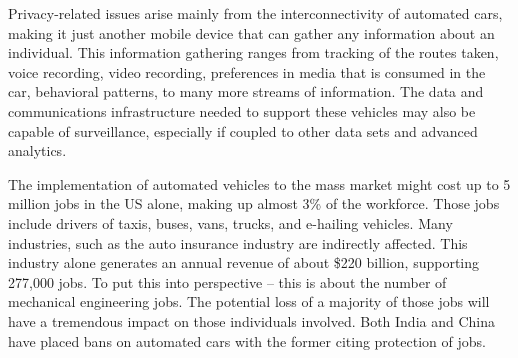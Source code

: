Privacy-related issues arise mainly from the interconnectivity of automated
cars, making it just another mobile device that can gather any information about
an individual. This information gathering ranges from tracking of the routes
taken, voice recording, video recording, preferences in media that is consumed
in the car, behavioral patterns, to many more streams of information. The data and
communications infrastructure needed to support these vehicles may also be
capable of surveillance, especially if coupled to other data sets and advanced
analytics.

The implementation of automated vehicles to the mass market might cost up to 5
million jobs in the US alone, making up almost 3\% of the workforce. Those jobs
include drivers of taxis, buses, vans, trucks, and e-hailing vehicles. Many
industries, such as the auto insurance industry are indirectly affected. This
industry alone generates an annual revenue of about \$220 billion, supporting
277,000 jobs. To put this into perspective – this is about the number of
mechanical engineering jobs. The potential loss of a majority of those jobs will
have a tremendous impact on those individuals involved. Both India and China
have placed bans on automated cars with the former citing protection of jobs.
